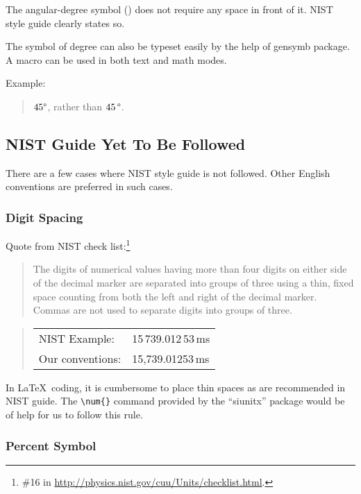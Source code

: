 The angular-degree symbol (\degree) does not require any space in front
of it. NIST style guide clearly states so.

The symbol of degree can also be typeset easily by the help of gensymb
package.
A macro \qco{\\degree} can be used in both text and math modes.

Example:

\begin{quote}
  $45\degree$, rather than $45\,\degree$.
\end{quote}

\subsection{NIST Guide Yet To Be Followed}
\label{sec:app:styleguide:NIST Guides Yet To Be Followed}

There are a few cases where NIST style guide is not followed.
Other English conventions are preferred in such cases.

\subsubsection{Digit Spacing}
\label{sec:app:styleguide:Digit Spacing}

Quote from NIST check list:\footnote{
  \#16 in \url{http://physics.nist.gov/cuu/Units/checklist.html}.
}

\begin{quote}
  The digits of numerical values having more than four digits on either
  side of the decimal marker are separated into groups of three using
  a thin, fixed space counting from both the left and right of the decimal
  marker. Commas are not used to separate digits into groups of three.
\end{quote}

\begin{quote}
\begin{tabular}{ll}
  NIST Example:& 15\,739.012\,53\,ms\\
  Our conventions:& 15,739.01253\,ms\\
\end{tabular}
\end{quote}

In \LaTeX\ coding, it is cumbersome to place thin spaces as are recommended
in NIST guide. The \verb|\num{}| command provided by the ``siunitx''
package would be of help for us to follow this rule.

\subsubsection{Percent Symbol}
\label{sec:app:styleguide:Percent Symbol}

